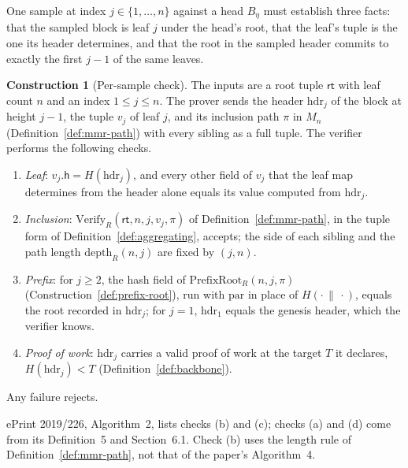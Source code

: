 \documentclass[11pt,a4paper]{article}
\theoremstyle{definition}
\newtheorem{construction}[theorem]{Construction}
\begin{document}
One sample at index $j\in\{1,\dots,n\}$ against a head $B_\eta$ must establish
three facts: that the sampled block is leaf $j$ under the head's root, that
the leaf's tuple is the one its header determines, and that the root in the
sampled header commits to exactly the first $j-1$ of the same leaves.

\begin{construction}[Per-sample check]\label{def:per-sample}
The inputs are a root tuple $\mathsf{rt}$ with leaf count $n$ and an index
$1\le j\le n$. The prover sends the header $\mathrm{hdr}_j$ of the block at
height $j-1$, the tuple $v_j$ of leaf $j$, and its inclusion path $\pi$ in
$M_n$ (Definition~\ref{def:mmr-path}) with every sibling as a full tuple. The
verifier performs the following checks.
\begin{enumerate}[label=(\alph*)]
\item \emph{Leaf}: $v_j.\mathsf{h}=H(\mathrm{hdr}_j)$, and every other field
  of $v_j$ that the leaf map determines from the header alone equals its
  value computed from $\mathrm{hdr}_j$.
\item \emph{Inclusion}: $\mathrm{Verify}_R(\mathsf{rt},n,j,v_j,\pi)$ of
  Definition~\ref{def:mmr-path}, in the tuple form of
  Definition~\ref{def:aggregating}, accepts; the side of each sibling and the
  path length $\mathrm{depth}_R(n,j)$ are fixed by $(j,n)$.
\item \emph{Prefix}: for $j\ge 2$, the hash field of
  $\mathrm{PrefixRoot}_R(n,j,\pi)$ (Construction~\ref{def:prefix-root}), run
  with $\mathrm{par}$ in place of $H(\cdot\,\|\,\cdot)$, equals the root
  recorded in $\mathrm{hdr}_j$; for $j=1$, $\mathrm{hdr}_1$ equals the
  genesis header, which the verifier knows.
\item \emph{Proof of work}: $\mathrm{hdr}_j$ carries a valid proof of work
  at the target $T$ it declares, $H(\mathrm{hdr}_j)<T$
  (Definition~\ref{def:backbone}).
\end{enumerate}
Any failure rejects.
\end{construction}

ePrint 2019/226, Algorithm~2, lists checks (b) and (c); checks (a) and (d)
come from its Definition~5 and Section~6.1. Check (b) uses the length rule
of Definition~\ref{def:mmr-path}, not that of the paper's Algorithm~4.
\end{document}

